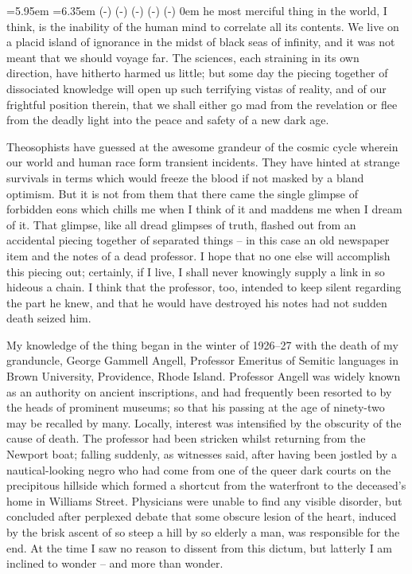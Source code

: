 
\baselineskip
\noindent\leavevmode
{}
\baselineskip
{}=5.95em
=6.35em
	 \dimexpr(\hsize-)
	 \dimexpr(\hsize-)
	 \dimexpr(\hsize-)
	 \dimexpr(\hsize-)
	 \dimexpr(\hsize-)
	0em \hsize
\noindent
{\sc he most merciful thing} in the world, I think, is the inability of the human mind to correlate all its contents. We live on a placid island of ignorance in the midst of black seas of infinity, and it was not meant that we should voyage far. The sciences, each straining in its own direction, have hitherto harmed us little; but some day the piecing together of dissociated knowledge will open up such terrifying vistas of reality, and of our frightful position therein, that we shall either go mad from the revelation or flee from the deadly light into the peace and safety of a new dark age.

Theosophists have guessed at the awesome grandeur of the cosmic cycle wherein our world and human race form transient incidents. They have hinted at strange survivals in terms which would freeze the blood if not masked by a bland optimism. But it is not from them that there came the single glimpse of forbidden eons which chills me when I think of it and maddens me when I dream of it. That glimpse, like all dread glimpses of truth, flashed out from an accidental piecing together of separated things⁠ – in this case an old newspaper item and the notes of a dead professor. I hope that no one else will accomplish this piecing out; certainly, if I live, I shall never knowingly supply a link in so hideous a chain. I think that the professor, too, intended to keep silent regarding the part he knew, and that he would have destroyed his notes had not sudden death seized him.

My knowledge of the thing began in the winter of 1926⁠–⁠27 with the death of my granduncle, George Gammell Angell, Professor Emeritus of Semitic languages in Brown University, Providence, Rhode Island. Professor Angell was widely known as an authority on ancient inscriptions, and had frequently been resorted to by the heads of prominent museums; so that his passing at the age of ninety-two may be recalled by many. Locally, interest was intensified by the obscurity of the cause of death. The professor had been stricken whilst returning from the Newport boat; falling suddenly, as witnesses said, after having been jostled by a nautical-looking negro who had come from one of the queer dark courts on the precipitous hillside which formed a shortcut from the waterfront to the deceased’s home in Williams Street. Physicians were unable to find any visible disorder, but concluded after perplexed debate that some obscure lesion of the heart, induced by the brisk ascent of so steep a hill by so elderly a man, was responsible for the end. At the time I saw no reason to dissent from this dictum, but latterly I am inclined to wonder⁠ – and more than wonder.

